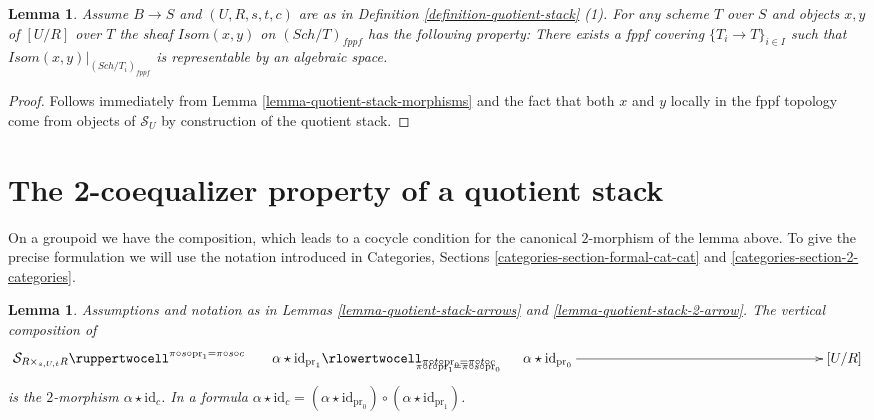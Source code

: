 \documentclass{stacks-project}
\theoremstyle{plain}
\newtheorem{lemma}[subsection]{Lemma}
\theoremstyle{definition}
\theoremstyle{remark}
\numberwithin{equation}{subsection}
\def\Sch{\mathit{Sch}}
\begin{document}
\begin{lemma}
\label{lemma-quotient-stack-isom}
Assume $B \to S$ and $(U, R, s, t, c)$ are as in
Definition \ref{definition-quotient-stack} (1).
For any scheme $T$ over $S$ and objects $x, y$ of $[U/R]$ over $T$
the sheaf $\mathit{Isom}(x, y)$ on $(\Sch/T)_{fppf}$ has
the following property: There exists a fppf covering
$\{T_i \to T\}_{i \in I}$ such that
$\mathit{Isom}(x, y)|_{(\Sch/T_i)_{fppf}}$
is representable by an algebraic space.
\end{lemma}

\begin{proof}
Follows immediately from
Lemma \ref{lemma-quotient-stack-morphisms}
and the fact that both $x$ and $y$ locally in the fppf
topology come from objects of $\mathcal{S}_U$ by construction
of the quotient stack.
\end{proof}














\section{The 2-coequalizer property of a quotient stack}
\label{section-quotient-stacks-2-coequalize}

\noindent
On a groupoid we have the composition, which leads to a cocycle
condition for the canonical $2$-morphism of the lemma above.
To give the precise formulation we will use the notation introduced in
Categories, Sections \ref{categories-section-formal-cat-cat} and
\ref{categories-section-2-categories}.

\begin{lemma}
\label{lemma-quotient-stack-cocycle}
Assumptions and notation as in
Lemmas \ref{lemma-quotient-stack-arrows} and
\ref{lemma-quotient-stack-2-arrow}.
The vertical composition of
$$
\xymatrix@C=15pc{
\mathcal{S}_{R \times_{s, U, t} R}
\ruppertwocell^{\pi \circ s \circ \text{pr}_1 = \pi \circ s \circ c}{\ \ \ \ \ \ \alpha \star \text{id}_{\text{pr}_1}}
\ar[r]_(.3){\pi \circ t \circ \text{pr}_1 = \pi \circ s \circ \text{pr}_0}
\rlowertwocell_{\pi \circ t \circ \text{pr}_0 = \pi \circ t \circ c}{\ \ \ \ \ \ \alpha \star \text{id}_{\text{pr}_0}}
&
[U/R]
}
$$
is the $2$-morphism $\alpha \star \text{id}_c$. In a formula
$\alpha \star \text{id}_c =
(\alpha \star \text{id}_{\text{pr}_0})
\circ
(\alpha \star \text{id}_{\text{pr}_1})
$.
\end{lemma}
\end{document}
